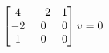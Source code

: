 \documentclass[preview]{standalone}
\begin{document}
\begin{align*}
\special{dvisvgm:raw <g id='unique000'>}\begin{bmatrix} 4 & -2 & 1 \\ -2 & 0 & 0 \\ 1 & 0 & 0 \end{bmatrix} v = 0\special{dvisvgm:raw </g>}
\end{align*}
\end{document}
